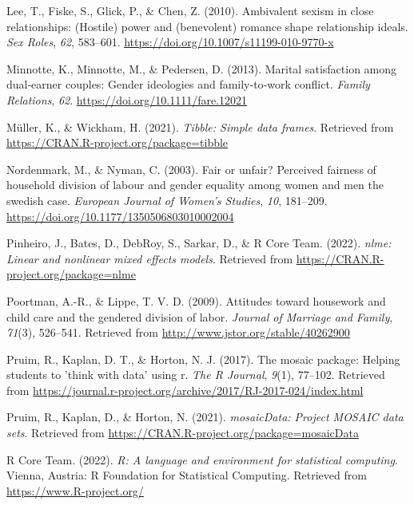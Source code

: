 \documentclass[
  man]{apa6}
\newlength{\cslhangindent}
\newlength{\cslentryspacingunit} %
\newenvironment{CSLReferences}[2] %
 {%
  \setlength{\parindent}{0pt}
  \ifodd #1
  \let\oldpar\par
  \def\par{\hangindent=\cslhangindent\oldpar}
  \fi
  \setlength{\parskip}{#2\cslentryspacingunit}
 }%
 {}
\begin{document}
\begin{CSLReferences}{1}{0}
\leavevmode{}%
Lee, T., Fiske, S., Glick, P., \& Chen, Z. (2010). Ambivalent sexism in close relationships: (Hostile) power and (benevolent) romance shape relationship ideals. \emph{Sex Roles}, \emph{62}, 583--601. \url{https://doi.org/10.1007/s11199-010-9770-x}

\leavevmode{}%
Minnotte, K., Minnotte, M., \& Pedersen, D. (2013). Marital satisfaction among dual‐earner couples: Gender ideologies and family‐to‐work conflict. \emph{Family Relations}, \emph{62}. \url{https://doi.org/10.1111/fare.12021}

\leavevmode{}%
Müller, K., \& Wickham, H. (2021). \emph{Tibble: Simple data frames}. Retrieved from \url{https://CRAN.R-project.org/package=tibble}

\leavevmode{}%
Nordenmark, M., \& Nyman, C. (2003). Fair or unfair? Perceived fairness of household division of labour and gender equality among women and men the swedish case. \emph{European Journal of Women's Studies}, \emph{10}, 181--209. \url{https://doi.org/10.1177/1350506803010002004}

\leavevmode{}%
Pinheiro, J., Bates, D., DebRoy, S., Sarkar, D., \& R Core Team. (2022). \emph{{nlme}: Linear and nonlinear mixed effects models}. Retrieved from \url{https://CRAN.R-project.org/package=nlme}

\leavevmode{}%
Poortman, A.-R., \& Lippe, T. V. D. (2009). Attitudes toward housework and child care and the gendered division of labor. \emph{Journal of Marriage and Family}, \emph{71}(3), 526--541. Retrieved from \url{http://www.jstor.org/stable/40262900}

\leavevmode{}%
Pruim, R., Kaplan, D. T., \& Horton, N. J. (2017). The mosaic package: Helping students to 'think with data' using r. \emph{The R Journal}, \emph{9}(1), 77--102. Retrieved from \url{https://journal.r-project.org/archive/2017/RJ-2017-024/index.html}

\leavevmode{}%
Pruim, R., Kaplan, D., \& Horton, N. (2021). \emph{mosaicData: Project MOSAIC data sets}. Retrieved from \url{https://CRAN.R-project.org/package=mosaicData}

\leavevmode{}%
R Core Team. (2022). \emph{R: A language and environment for statistical computing}. Vienna, Austria: R Foundation for Statistical Computing. Retrieved from \url{https://www.R-project.org/}


\end{CSLReferences}
\end{document}
